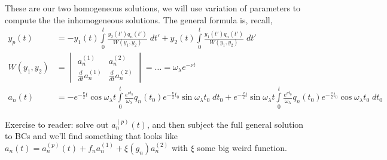 \documentclass[12pt]{article}
\newcommand{\rd}[2]{\frac{d#1}{d#2}}
\begin{document}
These are our two homogeneous solutions, we will use variation of parameters to compute the the inhomogeneous solutions. The general formula is, recall,
\begin{align}
    y_p(t) &= -y_1(t)\int\limits_{0}^{t}\frac{y_2(t')q_n(t')}{W(y_1, y_2)}\;dt' + y_2(t)\int\limits_{0}^{t}\frac{y_1(t')q_n(t')}{W(y_1,y_2)}\;dt'\\
    W(y_1,y_2) &= \begin{vmatrix} a_n^{(1)} & a_n^{(2)}\\ \rd{}{t}a_n^{(1)} & \rd{}{t}a_n^{(2)}\end{vmatrix} = \dots = \omega_\lambda e^{-\nu t}\\
    a_n(t) &= -e^{-\frac{\nu}{2}t}\cos \omega_\lambda t \int\limits_{0}^{t}\frac{e^{\nu t_0}}{\omega_\lambda}q_n(t_0)e^{-\frac{\nu}{2}t_0}\sin \omega_\lambda t_0\;dt_0 + e^{-\frac{\nu}{2}t}\sin \omega_\lambda t \int\limits_{0}^{t}\frac{e^{\nu t_0}}{\omega_\lambda}q_n(t_0)e^{-\frac{\nu}{2}t_0}\cos \omega_\lambda t_0\;dt_0
\end{align}

Exercise to reader: solve out $a_n^{(p)}(t)$, and then subject the full general solution to BCs and we'll find something that looks like $a_n(t) =a_n^{(p)}(t) + f_n a_n^{(1)} + \xi(g_n)a_n^{(2)}$ with $\xi$ some big weird function.
\end{document}
